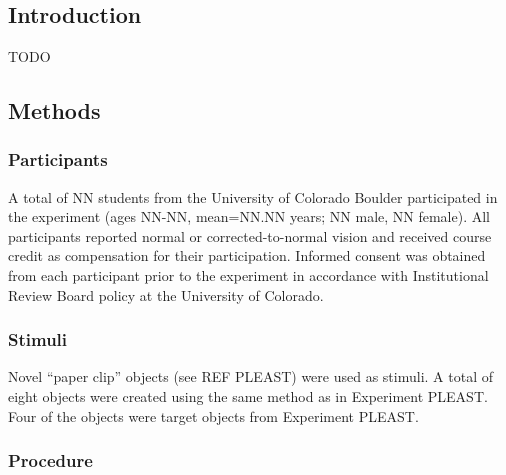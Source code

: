 \documentclass[dwyatte_dissertation.tex]{subfiles}
\begin{document}
\chapter{}

\section{Introduction}
TODO

\section{Methods}

\subsection{Participants}
A total of NN students from the University of Colorado Boulder participated in the experiment (ages NN-NN, mean=NN.NN years; NN male, NN female). All participants reported normal or corrected-to-normal vision and received course credit as	compensation for their participation. Informed consent was obtained from each participant prior to the experiment in accordance with Institutional Review Board policy at the University of Colorado.

\subsection{Stimuli}
Novel ``paper clip'' objects (see REF PLEAST) were used as stimuli. A total of eight objects were created using the same method as in Experiment PLEAST. Four of the objects were target objects from Experiment PLEAST.

\subsection{Procedure}



\end{document}

